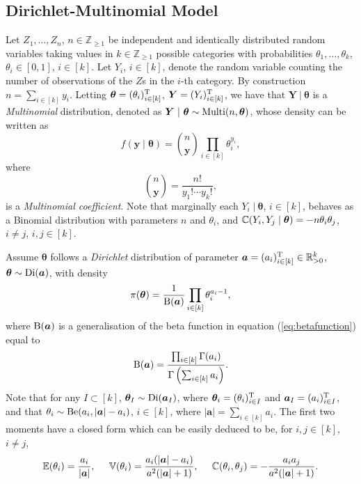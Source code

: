 \subsection{Dirichlet-Multinomial Model}
Let  $Z_1,\dots,Z_n$, $n\in\mathbb{Z}_{\geq 1}$ be independent and identically distributed random variables taking values in $k\in\mathbb{Z}_{\geq 1}$ possible categories with probabilities $\theta_1,\dots,\theta_k$, $\theta_i\in[0,1]$, $i\in[k]$. Let $Y_i$, $i\in[k]$, denote the random variable counting the number of observations of the $Z$s in the $i$-th category. By construction $n=\sum_{i\in[k]}y_i$. Letting $\bm{\theta}=(\theta_i)_{i\in[k]}^{\textnormal{T}}$, $\bm{Y}=(Y_i)_{i\in[k]}^{\textnormal{T}}$, we have that $\bm{Y}~|~\bm{\theta}$ is a \textit{Multinomial} distribution, denoted as $\bm{Y}~|~\bm{\theta}\sim \textnormal{Multi}(n,\bm{\theta})$, whose density can be written as
\begin{equation*}
f(\bm{y}\;|\;\bm{\theta})=\binom{n}{\bm{y}}\prod_{i\in[k]}\theta_i^{y_i},
\end{equation*} 
where
\begin{equation*}
\binom{n}{\bm{y}}=\frac{n!}{y_1!\cdots y_k!},
\end{equation*}
is a \textit{Multinomial coefficient}.
Note that marginally each $Y_i\;|~\bm{\theta}$, $i\in[k]$,  behaves as a Binomial distribution with parameters $n$ and $\theta_i$, and $\mathbb{C}(Y_i,Y_j\;|\;\bm{\theta})=-n\theta_i\theta_j$, $i\neq j$, $i,j\in[k]$.

Assume $\bm{\theta}$ follows a \textit{Dirichlet} distribution of parameter $\bm{a}=(a_i)_{i\in[k]}^{\textnormal{T}}\in\mathbb{R}^k_{>0}$, $\bm{\theta}\sim \textnormal{Di}(\bm{a})$, with density
\begin{equation*}
\pi(\bm{\theta})=\frac{1}{\textnormal{B}(\bm{a})}\prod_{i\in[k]}\theta_i^{a_i-1},
\end{equation*}
where $\textnormal{B}(\bm{a})$ is a generalisation of the beta function in equation (\ref{eq:betafunction}) equal to
\begin{equation*}
\textnormal{B}(\bm{a})=\frac{\prod_{i\in[k]}\Gamma(a_i)}{\Gamma\left(\sum_{i\in[k]}a_i\right)}.
\end{equation*}
Note that for any $I\subset[k]$, $\bm{\theta}_I\sim \textnormal{Di}(\bm{a}_I)$, where $\bm{\theta}_i=(\theta_i)^{\textnormal{T}}_{i\in I}$ and $\bm{a}_I=(a_i)_{i\in I}^{\textnormal{T}}$, and that $\theta_i\sim \textnormal{Be}(a_i,|\bm{a}|-a_i)$, $i\in[k]$, where $|\bm{a}|=\sum_{i\in[k]}a_i$. The first two moments have a closed form which can be easily deduced to be, for $i,j\in[k]$, $i\neq j$, 
\begin{equation*}
\mathbb{E}(\theta_i)=\frac{a_i}{|\bm{a}|},\;\;\;\;\;\mathbb{V}(\theta_i)=\frac{a_i(|\bm{a}|-a_i)}{a^2(|\bm{a}|+1)},\;\;\;\;\; \mathbb{C}(\theta_i,\theta_j)=-\frac{a_ia_j}{a^2(|\bm{a}|+1)}.
\end{equation*}

